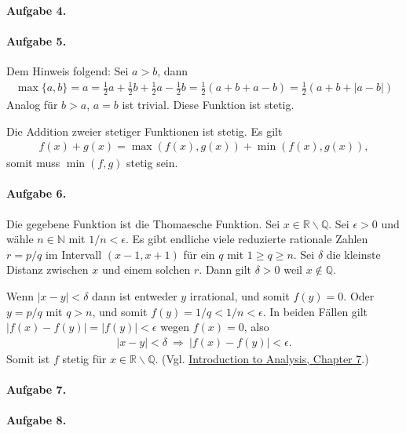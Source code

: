 \documentclass{article}
\begin{document}
\paragraph{Aufgabe 4.}

\paragraph{Aufgabe 5.} Dem Hinweis folgend: Sei $a > b$, dann
\begin{align*}
    \max\{a, b\} = a = \frac{1}{2}a + \frac{1}{2}b + \frac{1}{2}a - \frac{1}{2}b = \frac{1}{2}(a + b + a - b) = \frac{1}{2}(a + b + |a - b|)
\end{align*}
Analog für $b > a$, $a = b$ ist trivial. Diese Funktion ist stetig.

Die Addition zweier stetiger Funktionen ist stetig. Es gilt \begin{align*}
    f(x) + g(x) = \max(f(x), g(x)) + \min(f(x), g(x)),
\end{align*} somit muss $\min(f, g)$ stetig sein.

\paragraph{Aufgabe 6.} Die gegebene Funktion ist die Thomaesche Funktion. Sei $x \in \mathbb{R} \backslash \mathbb{Q}$. Sei $\epsilon > 0$ und wähle $n \in \mathbb{N}$ mit $1/n < \epsilon$. Es gibt endliche viele reduzierte rationale Zahlen $r = p/q$ im Intervall $(x - 1, x + 1)$ für ein $q$ mit $1 \geq q \geq n$. Sei $\delta$ die kleinste Distanz zwischen $x$ und einem solchen $r$. Dann gilt $\delta > 0$ weil $x \not\in \mathbb{Q}$.

Wenn $|x - y| < \delta$ dann ist entweder $y$ irrational, und somit $f(y) = 0$. Oder $y = p/q$ mit $q > n$, und somit $f(y) = 1/q < 1/n < \epsilon$. In beiden Fällen gilt $|f(x) - f(y)| = |f(y)| < \epsilon$ wegen $f(x) = 0$, also
\begin{align*}
    |x - y| < \delta\ \Rightarrow\ |f(x) - f(y)| < \epsilon.
\end{align*}
Somit ist $f$ stetig für $x \in \mathbb{R} \backslash \mathbb{Q}$. (Vgl. \href{https://www.math.ucdavis.edu/~hunter/intro_analysis_pdf/ch7.pdf}{Introduction to Analysis, Chapter 7}.)

\paragraph{Aufgabe 7.}

\paragraph{Aufgabe 8.}
\end{document}
